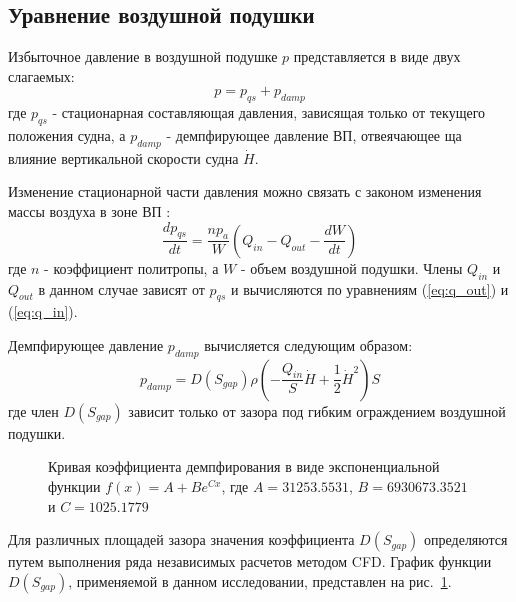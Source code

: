 \begin{centering}
    \subsection{Уравнение воздушной подушки}
\end{centering}

Избыточное давление в воздушной подушке $p$ представляется в виде двух слагаемых:
\begin{equation}
    p = p_{qs} + p_{damp}
\end{equation}
где $p_{qs}$ - стационарная составляющая давления, зависящая только от текущего положения судна, а $p_{damp}$ - демпфирующее давление ВП, отвеячающее ща влияние вертикальной скорости судна $\dot{H}$.

Изменение стационарной части давления можно связать с законом изменения массы воздуха в зоне ВП \cite[раздел 2.1]{shabarov2022analytical}:
\begin{equation}\label{eq:p_qs}
    \dfrac{dp_{qs}}{dt} = \dfrac{np_a}{W} \left( Q_{in} - Q_{out} - \dfrac{dW}{dt}\right)
\end{equation}
где $n$ - коэффициент политропы, а $W$ - объем воздушной подушки. Члены $Q_{in}$ и $Q_{out}$ в данном случае зависят от $p_{qs}$ и вычисляются по уравнениям (\ref{eq:q_out}) и (\ref{eq:q_in}). 

Демпфирующее давление $p_{damp}$ вычисляется следующим образом:
\begin{equation}
    p_{damp} = D(S_{gap})\rho \left( -\dfrac{Q_{in}}{S}\dot{H} + \dfrac{1}{2}\dot{H}^2 \right) S
\end{equation}
где член $D(S_{gap})$ зависит только от зазора под гибким ограждением воздушной подушки.

\begin{figure}[H]
    \centering
    
    \caption{Кривая коэффициента демпфирования в виде экспоненциальной функции $f(x) = A + B e^{Cx}$, где $A=31253.5531$, $B=6930673.3521$ и $C=1025.1779$}\label{fig:D_S_gap}
\end{figure}

Для различных площадей зазора значения коэффициента $D(S_{gap})$ определяются путем выполнения ряда независимых расчетов методом CFD. График функции $D(S_{gap})$, применяемой в данном исследовании, представлен на рис.~\ref{fig:D_S_gap}.